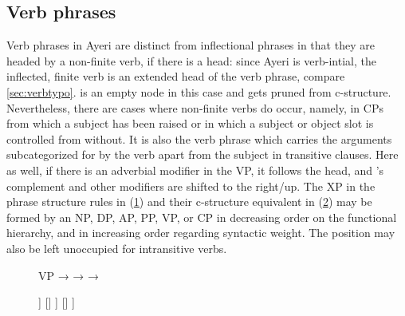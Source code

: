\subsection{Verb phrases}
\label{subsec:vps}

Verb phrases in Ayeri are distinct from inflectional phrases in that they are
headed by a non-finite verb, if there is a head: since Ayeri is verb-intial,
the inflected, finite verb is an extended head of the verb phrase, compare
\autoref{sec:verbtypo}.  is an empty node in this case and gets
pruned from c-structure. Nevertheless, there are cases where non-finite verbs
do occur, namely, in CPs from which a subject has been raised or in which a
subject or object slot is controlled from without. It is also the verb phrase
which carries the arguments subcategorized for by the verb apart from the
subject in transitive clauses. Here as well, if there is an adverbial modifier
in the VP, it follows the head, and 's complement and other modifiers
are shifted to the right/up. The XP in the phrase structure rules in
(\ref{ex:vppstruct}) and their c-structure equivalent in (\ref{ex:vpcstruct})
may be formed by an NP, DP, AP, PP, VP, or CP in decreasing order on the
functional hierarchy, and in increasing order regarding syntactic weight. The
position may also be left unoccupied for intransitive verbs.

\begin{figure}[h]
\pex\label{ex:vppstruct}
\a VP →  
\a {} →  
\a {} →  
\xe
\end{figure}

\begin{figure}
\ex\label{ex:vpcstruct}
\begin{forest}
[\anno{VP}
			[\anno{\xbar{V}}
				[\anno{\xhead{V}}
					[\anno{\xhead{V}}]
					[\anno{Cl}]
				]
				[{}]
			]
		[{}]
]
\end{forest}
\xe
\end{figure}

